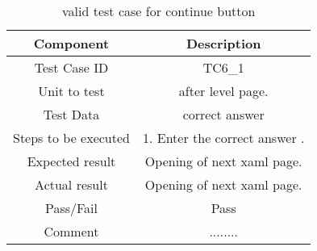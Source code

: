 \begin{table}[htb!]
\label{table : tc11}
\centering %
\begin{tabular}{c c} %
\hline\hline %
 Component & Description \\ [0.5ex] %
\hline %
Test Case ID & TC6\_1   \\
Unit to test &after level page. \\ 
Test Data &correct answer\\
Steps to be executed &1. Enter the correct answer .\\

Expected result  &Opening of next xaml page.\\ 
Actual result &Opening of next xaml page.\\
Pass/Fail &Pass\\
Comment &........\\

\hline %
\end{tabular}
\caption{valid test case for continue button} \label{table:tc11} %
\end{table}



